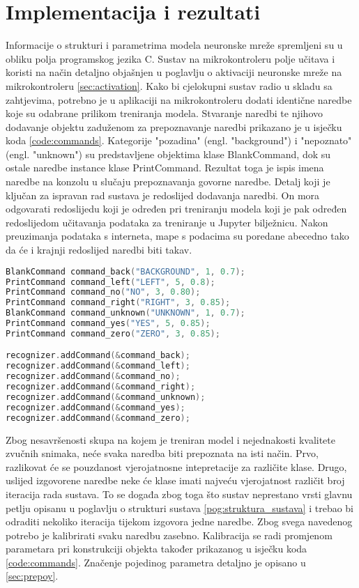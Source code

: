 \chapter{Implementacija i rezultati}
\label{pog:implement}

Informacije o strukturi i parametrima modela neuronske mreže spremljeni su u obliku polja
programskog jezika C. Sustav na mikrokontroleru polje učitava i koristi na način detaljno objašnjen 
u poglavlju o aktivaciji neuronske mreže na mikrokontroleru \ref{sec:activation}.
Kako bi cjelokupni sustav radio u skladu sa zahtjevima, potrebno je u aplikaciji
na mikrokontroleru dodati identične naredbe koje su odabrane prilikom treniranja
modela. Stvaranje naredbi te njihovo dodavanje objektu zaduženom za prepoznavanje
naredbi prikazano je u isječku koda \ref{code:commands}. Kategorije "pozadina" (engl. "background") i
"nepoznato" (engl. "unknown") su predstavljene objektima klase BlankCommand, dok su ostale naredbe 
instance klase PrintCommand. Rezultat toga je ispis imena naredbe na konzolu u slučaju
prepoznavanja govorne naredbe. Detalj koji je ključan za ispravan rad sustava je redoslijed
dodavanja naredbi. On mora odgovarati redoslijedu koji je određen pri treniranju modela koji
je pak određen redoslijedom učitavanja podataka za treniranje u Jupyter bilježnicu. Nakon
preuzimanja podataka s interneta, mape s podacima su poredane abecedno tako da 
će i krajnji redoslijed naredbi biti takav.

\begin{lstlisting}[language=C++, caption=Stvaranje naredbi, label=code:commands]
BlankCommand command_back("BACKGROUND", 1, 0.7);
PrintCommand command_left("LEFT", 5, 0.8);
PrintCommand command_no("NO", 3, 0.80);
PrintCommand command_right("RIGHT", 3, 0.85);
BlankCommand command_unknown("UNKNOWN", 1, 0.7);
PrintCommand command_yes("YES", 5, 0.85);
PrintCommand command_zero("ZERO", 3, 0.85);

recognizer.addCommand(&command_back);
recognizer.addCommand(&command_left);
recognizer.addCommand(&command_no);
recognizer.addCommand(&command_right);
recognizer.addCommand(&command_unknown);
recognizer.addCommand(&command_yes);
recognizer.addCommand(&command_zero);
\end{lstlisting}

Zbog nesavršenosti skupa na kojem je treniran model i nejednakosti kvalitete
zvučnih snimaka, neće svaka naredba biti prepoznata na isti način. Prvo, razlikovat će
se pouzdanost vjerojatnosne intepretacije za različite klase. Drugo, uslijed izgovorene
naredbe neke će klase imati najveću vjerojatnost različit broj iteracija rada sustava.
To se događa zbog toga što sustav neprestano vrsti glavnu petlju opisanu u poglavlju
o strukturi sustava \ref{pog:struktura_sustava} i trebao bi odraditi nekoliko iteracija tijekom izgovora
jedne naredbe. Zbog svega navedenog potrebo je kalibrirati svaku naredbu zasebno.
Kalibracija se radi promjenom parametara pri konstrukciji objekta također prikazanog 
u isječku koda \ref{code:commands}. Značenje pojedinog parametra detaljno je opisano u 
\ref{sec:prepoy}. 

